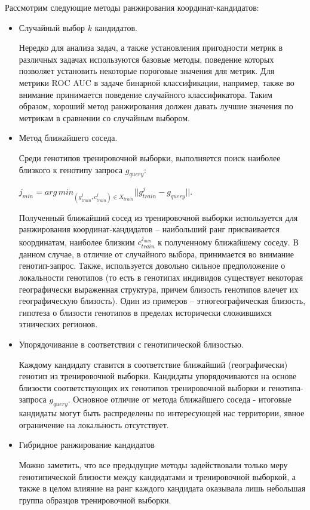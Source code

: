 Рассмотрим следующие методы ранжирования координат-кандидатов:
\begin{itemize}
\item Случайный выбор $k$ кандидатов.

Нередко для анализа задач, а также установления пригодности метрик в различных задачах
используются базовые методы, поведение которых позволяет установить некоторые пороговые значения для метрик.
Для метрики ROC AUC в задаче бинарной классификации, например, также во внимание принимается
поведение случайного классификатора. Таким образом, хороший метод ранжирования должен давать лучшие значения по
метрикам в сравнении со случайным выбором.

\item Метод ближайшего соседа.

Среди генотипов тренировочной выборки, выполняется поиск наиболее близкого к генотипу запроса $g_{query}$:

$ j_{min} = arg\,min_{\left(g^j_{train}, c^j_{train}\right) \in X_{train}} ||g^j_{train} - g_{query}||$.

Полученный ближайший сосед из тренировочной выборки используется для ранжирования координат-кандидатов --
наибольший ранг присваивается координатам, наиболее близким $c^{j_{min}}_{train}$ к полученному ближайшему соседу.
В данном случае, в отличие от случайного выбора, принимается во внимание генотип-запрос. Также, используется довольно сильное
предположение о локальности генотипов (то есть в генотипах индивидов существует некоторая географически выраженная структура,
причем близость генотипов влечет их географическую близость). Один из примеров -- этногеографическая близость,
гипотеза о близости генотипов в пределах исторически сложившихся этнических регионов.

\item Упорядочивание в соответствии с генотипической близостью.

Каждому кандидату ставится в соответствие ближайший (географически) генотип из тренировочной выборки.
Кандидаты упорядочиваются на основе близости соответствующих их генотипов тренировочной выборки и генотипа-запроса $g_{query}$.
Основное отличие от метода ближайшего соседа - итоговые кандидаты могут быть распределены по интересующей нас территории, явное ограничение на локальность отсутствует.

\item Гибридное ранжирование кандидатов

Можно заметить, что все предыдущие методы задействовали только меру генотипической близости между кандидатами и тренировочной выборкой, а также
в целом влияние на ранг каждого кандидата оказывала лишь небольшая группа образцов тренировочной выборки.


\end{itemize}
